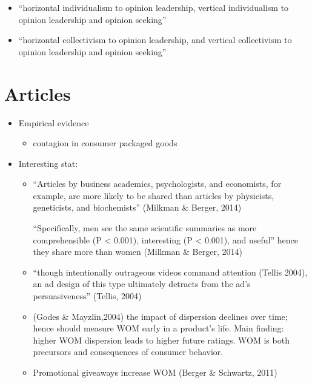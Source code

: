 \documentclass[
]{book}
\providecommand{\tightlist}{%
  \setlength{\itemsep}{0pt}\setlength{\parskip}{0pt}}
\begin{document}
\begin{itemize}
  \begin{itemize}
  \item
    ``horizontal individualism to opinion leadership, vertical individualism to opinion leadership and opinion seeking''
  \item
    ``horizontal collectivism to opinion leadership, and vertical collectivism to opinion leadership and opinion seeking''
  \end{itemize}
\end{itemize}

\hypertarget{articles}{%
\section{Articles}\label{articles}}

\begin{itemize}
\item
  Empirical evidence

  \begin{itemize}
  \tightlist
  \item
    contagion in consumer packaged goods \citep{Du_2011}
  \end{itemize}
\item
  Interesting stat:

  \begin{itemize}
  \item
    ``Articles by business academics, psychologists, and economists, for example, are more likely to be shared than articles by physicists, geneticists, and biochemists'' (Milkman \& Berger, 2014)

    ``Specifically, men see the same scientific summaries as more comprehensible (P \textless{} 0.001), interesting (P \textless{} 0.001), and useful'' hence they share more than women (Milkman \& Berger, 2014)
  \item
    ``though intentionally outrageous videos command attention (Tellis 2004), an ad design of this type ultimately detracts from the ad's persuasiveness'' (Tellis, 2004)
  \item
    (Godes \& Mayzlin,2004) the impact of dispersion declines over time; hence should measure WOM early in a product's life. Main finding: higher WOM dispersion leads to higher future ratings. WOM is both precursors and consequences of consumer behavior.
  \item
    Promotional giveaways increase WOM (Berger \& Schwartz, 2011)
  \end{itemize}
\end{itemize}
\end{document}
